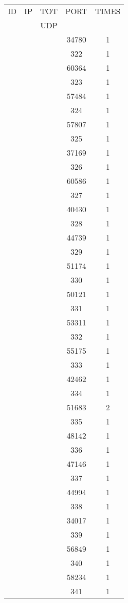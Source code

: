 \documentclass[a4paper]{scrartcl}
\begin{document}
\begin{minipage}[b]{0.5\linewidth}
\begin{tabular}{| c | c | c | c | c |}
\hline
ID & IP & TOT & PORT & TIMES \\ 
   &    & UDP &      &       \\ 
\hline
& & & 34780 & 1 \\ & & & 322 & 1 \\ & & & 60364 & 1 \\ & & & 323 & 1 \\ & & & 57484 & 1 \\ & & & 324 & 1 \\ & & & 57807 & 1 \\ & & & 325 & 1 \\ & & & 37169 & 1 \\ & & & 326 & 1 \\ & & & 60586 & 1 \\ & & & 327 & 1 \\ & & & 40430 & 1 \\ & & & 328 & 1 \\ & & & 44739 & 1 \\ & & & 329 & 1 \\ & & & 51174 & 1 \\ & & & 330 & 1 \\ & & & 50121 & 1 \\ & & & 331 & 1 \\ & & & 53311 & 1 \\ & & & 332 & 1 \\ & & & 55175 & 1 \\ & & & 333 & 1 \\ & & & 42462 & 1 \\ & & & 334 & 1 \\ & & & 51683 & 2 \\ & & & 335 & 1 \\ & & & 48142 & 1 \\ & & & 336 & 1 \\ & & & 47146 & 1 \\ & & & 337 & 1 \\ & & & 44994 & 1 \\ & & & 338 & 1 \\ & & & 34017 & 1 \\ & & & 339 & 1 \\ & & & 56849 & 1 \\ & & & 340 & 1 \\ & & & 58234 & 1 \\ & & & 341 & 1 \\ \hline\end{tabular}\end{minipage} \hfill\begin{minipage}[b]{0.5\linewidth}\begin{tabular}{| c | c | c | c | c |}

\end{tabular}
\end{minipage}
\end{document}

